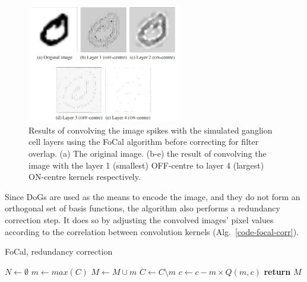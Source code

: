 \begin{figure}[hbt]
	\centering
	\includegraphics[width=0.6\textwidth]{pics_bench/fig2}
	\caption{Results of convolving the image spikes with the simulated ganglion cell layers using the FoCal algorithm before correcting for filter overlap. (a) The original image. (b-e) the result of convolving the image with the layer 1 (smallest) OFF-centre to layer 4 (largest) ON-centre kernels respectively.}
	\label{fig-convolution-results}
\end{figure}

Since DoGs are used as the means to encode the image, and they do not form an orthogonal set of basis functions, the algorithm also performs a redundancy correction step.
It does so by adjusting the convolved images' pixel values according to the correlation between convolution kernels (Alg.~\ref{code-focal-corr}).

\begin{algorithm}[h]
	\caption{FoCal, redundancy correction}
	\label{code-focal-corr}
	\begin{algorithmic}
		\State $N \leftarrow \emptyset$ 
		\Repeat
		\State $m \leftarrow max(C)$
		\State $M \leftarrow M \cup m$
		\State $C \leftarrow C \setminus m$
		 
		 
		\State $c \leftarrow c - m \times Q(m, c)$
		\EndIf
		\EndFor
		\State \textbf{return} $M$
		\EndProcedure
	\end{algorithmic}
\end{algorithm}


